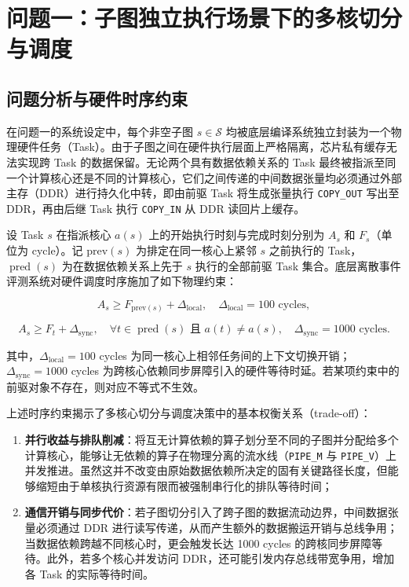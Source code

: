 \documentclass[anonymous,withtoc]{gmcm2026}
\providecommand{\tightlist}{\setlength{\itemsep}{0pt}\setlength{\parskip}{0pt}}
\begin{document}
\section{问题一：子图独立执行场景下的多核切分与调度}

\subsection{问题分析与硬件时序约束}

在问题一的系统设定中，每个非空子图 \(s \in \mathcal{S}\) 均被底层编译系统独立封装为一个物理硬件任务（Task）。由于子图之间在硬件执行层面上严格隔离，芯片私有缓存无法实现跨 Task 的数据保留。无论两个具有数据依赖关系的 Task 最终被指派至同一个计算核心还是不同的计算核心，它们之间传递的中间数据张量均必须通过外部主存（DDR）进行持久化中转，即由前驱 Task 将生成张量执行 \texttt{COPY\_OUT} 写出至 DDR，再由后继 Task 执行 \texttt{COPY\_IN} 从 DDR 读回片上缓存。

设 Task \(s\) 在指派核心 \(a(s)\) 上的开始执行时刻与完成时刻分别为 \(A_s\) 和 \(F_s\)（单位为 cycle）。记 \(\mathrm{prev}(s)\) 为排定在同一核心上紧邻 \(s\) 之前执行的 Task，\(\operatorname{pred}(s)\) 为在数据依赖关系上先于 \(s\) 执行的全部前驱 Task 集合。底层离散事件评测系统对硬件调度时序施加了如下物理约束：

\begin{equation}
A_s \ge F_{\mathrm{prev}(s)} + \Delta_{\mathrm{local}}, \quad \Delta_{\mathrm{local}} = 100 \text{ cycles},
\end{equation}

\begin{equation}
A_s \ge F_t + \Delta_{\mathrm{sync}}, \quad \forall t \in \operatorname{pred}(s) \text{ 且 } a(t) \ne a(s), \quad \Delta_{\mathrm{sync}} = 1000 \text{ cycles}.
\end{equation}

其中，\(\Delta_{\mathrm{local}} = 100\) cycles 为同一核心上相邻任务间的上下文切换开销；\(\Delta_{\mathrm{sync}} = 1000\) cycles 为跨核心依赖同步屏障引入的硬件等待时延。若某项约束中的前驱对象不存在，则对应不等式不生效。

上述时序约束揭示了多核心切分与调度决策中的基本权衡关系（trade-off）：

\begin{enumerate}
\def\labelenumi{\arabic{enumi}.}
\tightlist
\item
  \textbf{并行收益与排队削减}：将互无计算依赖的算子划分至不同的子图并分配给多个计算核心，能够让无依赖的算子在物理分离的流水线（\texttt{PIPE\_M} 与 \texttt{PIPE\_V}）上并发推进。虽然这并不改变由原始数据依赖所决定的固有关键路径长度，但能够缩短由于单核执行资源有限而被强制串行化的排队等待时间；
\item
  \textbf{通信开销与同步代价}：若子图切分引入了跨子图的数据流动边界，中间数据张量必须通过 DDR 进行读写传递，从而产生额外的数据搬运开销与总线争用；当数据依赖跨越不同核心时，更会触发长达 1000 cycles 的跨核同步屏障等待。此外，若多个核心并发访问 DDR，还可能引发内存总线带宽争用，增加各 Task 的实际等待时间。
\end{enumerate}
\end{document}
